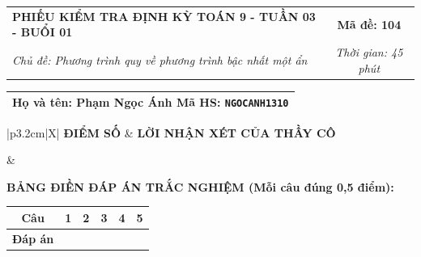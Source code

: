 \documentclass[12pt,a4paper]{article}
\begin{document}
\newpage


\noindent
\begin{tabularx}{\linewidth}{|X|c|}
\hline
\textbf{PHIẾU KIỂM TRA ĐỊNH KỲ TOÁN 9 - TUẦN 03 - BUỔI 01} & \textbf{Mã đề: 104} \\
\textit{Chủ đề: Phương trình quy về phương trình bậc nhất một ẩn} & \textit{Thời gian: 45 phút} \\
\hline
\end{tabularx}

\vspace{1mm}

\noindent
\begin{tabularx}{\linewidth}{|X|}
\hline
\rule[-2mm]{0pt}{7.5mm}\textbf{Họ và tên:} \textbf{\large Phạm Ngọc Ánh} \hfill \textbf{Mã HS:} \texttt{NGOCANH1310} \quad \\
\hline
\end{tabularx}

\vspace{1mm}

\noindent
\begin{tabularx}{\linewidth}{|p{3.2cm}|X|}
\hline
\centering\textbf{ĐIỂM SỐ} & \centering\textbf{LỜI NHẬN XÉT CỦA THẦY CÔ} \tabularnewline
\hline
\rule{0pt}{1.3cm} & \tabularnewline
\hline
\end{tabularx}

\vspace{1.2mm}

\noindent\textbf{BẢNG ĐIỀN ĐÁP ÁN TRẮC NGHIỆM (Mỗi câu đúng 0,5 điểm):}
\vspace{0.8mm}

\noindent
\renewcommand{\arraystretch}{1.35}
\begin{tabularx}{\linewidth}{|c|*{5}{>{\centering\arraybackslash}X|}}
\hline
\textbf{Câu} & \textbf{1} & \textbf{2} & \textbf{3} & \textbf{4} & \textbf{5} \\
\hline
\textbf{Đáp án} & & & & & \\
\hline
\end{tabularx}
\renewcommand{\arraystretch}{1.0}

\vspace{1.5mm}
\end{document}
